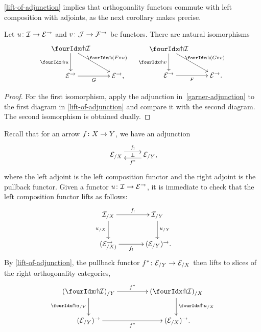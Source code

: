 \documentclass[reqno,10pt,a4paper,oneside,draft]{amsart}
\begin{document}
\cref{lift-of-adjunction} implies that orthogonality functors commute with left composition with adjoints, as the next corollary makes precise.

\begin{corollary} \label{pitchfork-adjunction}
Let $u \colon \mathcal{I} \to \mathcal{E}^\to$ and $v \colon \mathcal{J} \to \mathcal{F}^\to$ be functors.
There are natural isomorphisms
\begin{align*}
\xycenter{
  \liftr{\cal{I}}
  \ar[dr]^-{\liftr{(F \cc u)}}
  \ar[d]_-{\liftr{u}}
\\
  \catE^\to
  \ar[r]_-G
&
  \catE^\to
\rlap{,}}
&&
\xycenter{
  \liftl{\cal{I}}
  \ar[d]_-{\liftl{v}}
  \ar[dr]^-{\liftl{(G \cc v)}}
\\
  \catE^\to
  \ar[r]_-{F}
&
  \catE^\to
\rlap{.}}
\end{align*}
\end{corollary}

\begin{proof}
For the first isomorphism, apply the adjunction in~\eqref{garner-adjunction} to the first diagram in \cref{lift-of-adjunction} and compare it with the second diagram.
The second isomorphism is obtained dually.
\end{proof}

\begin{example} \label{exa:composition-pullback-lift}
Recall that for an arrow $f \colon X \to Y$, we have an adjunction
\[
\xymatrix{
\catE_{/X} \ar@<1ex>[r]^{f_{!}} \ar@{}[r]|{\bot} & \catE_{/Y} \rlap{,} \ar@<1ex>[l]^{f^*}}
\]
where the left adjoint is the left composition functor and the right adjoint is the pullback functor.
Given a functor $u \colon \mathcal{I} \to \mathcal{E}^\to$, it is immediate to check that the left composition functor lifts as follows:
\[
\xymatrix@C+1em{
  \cal{I}_{/X}
  \ar[r]^-{f_!}
  \ar[d]_{u_{/X}}
&
  \cal{I}_{/Y}
  \ar[d]^{u_{/Y}}
\\
  (\calE_{/X)}^\to
  \ar[r]_-{f_!}
&
  (\calE_{/Y})^\to \rlap{.}
}
\]
By \cref{lift-of-adjunction}, the pullback functor $f^* \colon \mathcal{E}_{/Y} \to \mathcal{E}_{/X}$ then lifts to slices of the right orthogonality categories,
\[
\xymatrix@C=1.5cm{
   (\liftr{\cal{I}})_{/ Y}
 \ar[d]_{{\liftr{u}}_{/Y}}
  \ar[r]^{f^*}
&
  (\liftr{\cal{I}})_{/X}
 \ar[d]^{{\liftr{u}}_{/X}}
\\
 ({\catE}_{/Y})^\to
  \ar[r]_{f^*}
&
   (\catE_{/X})^\to \rlap{.}
}
\]
\end{example}

\end{document}
